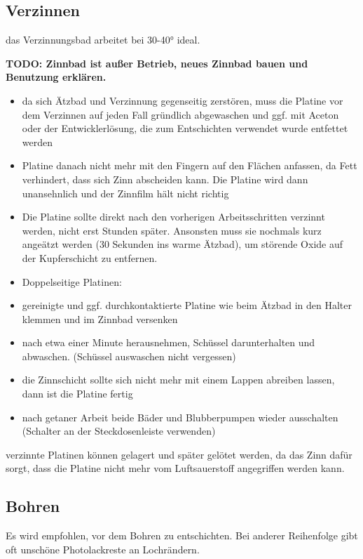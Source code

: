 \documentclass{\basedir/fablab-document}
\begin{document}
\subsection{Verzinnen}
\label{sec:verzinnen}
das Verzinnungsbad arbeitet bei 30-40° ideal.

\textbf{TODO: Zinnbad ist außer Betrieb, neues Zinnbad bauen und Benutzung erklären.}

\begin{itemize}
\item da sich Ätzbad und Verzinnung gegenseitig zerstören, muss die Platine vor dem Verzinnen auf jeden Fall gründlich abgewaschen und ggf. mit Aceton oder der Entwicklerlösung, die zum Entschichten verwendet wurde entfettet werden
\item Platine danach nicht mehr mit den Fingern auf den Flächen anfassen, da Fett verhindert, dass sich Zinn abscheiden kann. Die Platine wird dann unansehnlich und der Zinnfilm hält nicht richtig
\item Die Platine sollte direkt nach den vorherigen Arbeitsschritten verzinnt werden, nicht erst Stunden später. Ansonsten muss sie nochmals kurz angeätzt werden (30 Sekunden ins warme Ätzbad), um störende Oxide auf der Kupferschicht zu entfernen.
\item Doppelseitige Platinen: 
\item gereinigte und ggf. durchkontaktierte Platine wie beim Ätzbad in den Halter klemmen und im Zinnbad versenken
\item nach etwa einer Minute herausnehmen, Schüssel darunterhalten und abwaschen. (Schüssel auswaschen nicht vergessen)
\item die Zinnschicht sollte sich nicht mehr mit einem Lappen abreiben lassen, dann ist die Platine fertig
\item nach getaner Arbeit beide Bäder und Blubberpumpen wieder ausschalten (Schalter an der Steckdosenleiste verwenden)
\end{itemize}
verzinnte Platinen können gelagert und später gelötet werden, da das Zinn dafür sorgt, dass die Platine nicht mehr vom Luftsauerstoff angegriffen werden kann.

\subsection{Bohren}
\label{sec:bohren}
Es wird empfohlen, vor dem Bohren zu entschichten. Bei anderer Reihenfolge gibt oft unschöne Photolackreste an Lochrändern.
\end{document}
